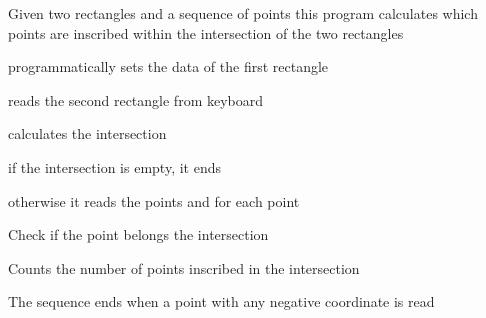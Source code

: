 Given two rectangles and a sequence of points this program calculates which points are inscribed within the intersection of the two rectangles
\begin{DoxyItemize}
\item programmatically sets the data of the first rectangle
\item reads the second rectangle from keyboard
\item calculates the intersection
\begin{DoxyItemize}
\item if the intersection is empty, it ends
\item otherwise it reads the points and for each point
\begin{DoxyItemize}
\item Check if the point belongs the intersection
\item Counts the number of points inscribed in the intersection
\item The sequence ends when a point with any negative coordinate is read 
\begin{DoxyCode}{0}
\DoxyCodeLine{ |     |                             |}
\DoxyCodeLine{ |     |    |                  |     |}
\DoxyCodeLine{ |     |    |                  |     |}
\DoxyCodeLine{ |     |    |                  |     |}
\DoxyCodeLine{ |     |    |                  |     |}
\DoxyCodeLine{ |     |    |                  |     |}
\DoxyCodeLine{ |     |    |                  |     |}
\DoxyCodeLine{ |     |                             |}
\DoxyCodeLine{ |     |                             |}
\DoxyCodeLine{ |}
\DoxyCodeLine{ |}
\DoxyCodeLine{}
\end{DoxyCode}
 
\end{DoxyItemize}
\end{DoxyItemize}
\end{DoxyItemize}